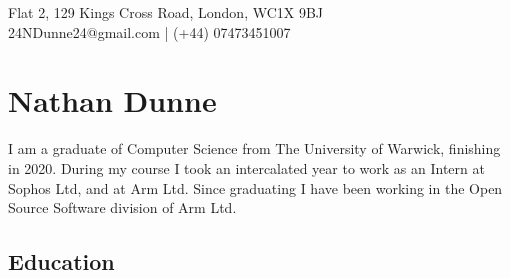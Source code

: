 \documentclass[11pt]{article}
\newcommand{\linesep}{\noindent\makebox[\linewidth]{\rule{\linewidth}{0.2pt}}}
\begin{document}
\hspace*{\fill} Flat 2, 129 Kings Cross Road, London, WC1X 9BJ \\
\hspace*{\fill} 24NDunne24@gmail.com | (+44) 07473451007
\section*{Nathan Dunne}

I am a graduate of Computer Science from The University of Warwick, finishing in 2020. During my course I took an intercalated year to work as an Intern at Sophos Ltd, and at Arm Ltd. Since graduating I have been working in the Open Source Software division of Arm Ltd. 

\linesep
\subsection*{Education}

\newcommand\result[7]{\node[commit] (#1) {}; 
  \node[llabel] at (#1) {
  #3\\
  \textcolor{darkgray}{#6}\\
  \hspace*{4ex}#7
  };
  \node[rlabel, text width=\textwidth-#2em] at (#1) {#5};
}

\newcommand\subresult[6]{\node[commit] (#1) {}; 
  \node[llabel] at (#1) {
  #3\\
  \hspace*{4ex}#6
  };
  \node[rlabel, text width=\textwidth-#2em] at (#1) {#5};
}
\newcommand\ghost[1]{\coordinate (#1);}
\newcommand\connect[2]{\path (#1) to[out=90,in=-90] (#2);}
\end{document}

